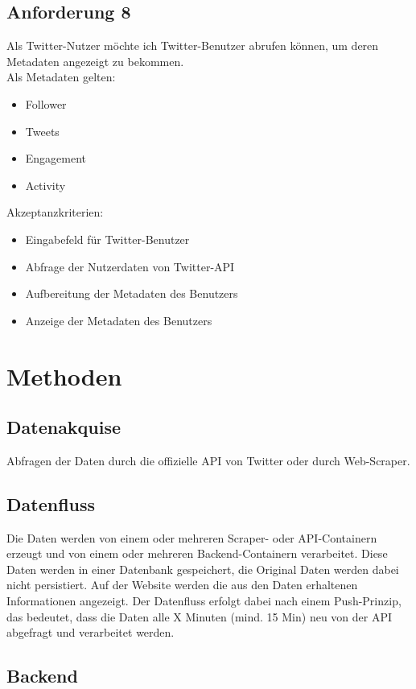 \documentclass[conference]{IEEEtran}
\begin{document}
\subsection{Anforderung 8}
Als Twitter-Nutzer möchte ich Twitter-Benutzer abrufen können,
um deren Metadaten angezeigt zu bekommen.
\\
Als Metadaten gelten:
\begin{itemize}
        \item Follower
        \item Tweets
        \item Engagement
        \item Activity
\end{itemize}
Akzeptanzkriterien:
\begin{itemize}
        \item Eingabefeld für Twitter-Benutzer
        \item Abfrage der Nutzerdaten von Twitter-API
        \item Aufbereitung der Metadaten des Benutzers
        \item Anzeige der Metadaten des Benutzers
\end{itemize}


\section{Methoden}

\subsection*{Datenakquise}

Abfragen der Daten durch die offizielle API von Twitter oder durch Web-Scraper.

\subsection*{Datenfluss}
Die Daten werden von einem oder mehreren Scraper- oder API-Containern erzeugt und von einem oder mehreren Backend-Containern verarbeitet.
Diese Daten werden in einer Datenbank gespeichert, die Original Daten werden dabei nicht persistiert.
Auf der Website werden die aus den Daten erhaltenen Informationen angezeigt.
Der Datenfluss erfolgt dabei nach einem Push-Prinzip, das bedeutet, dass die Daten alle X Minuten (mind. 15 Min) neu von der API abgefragt und verarbeitet werden.

\subsection*{Backend}
\end{document}
